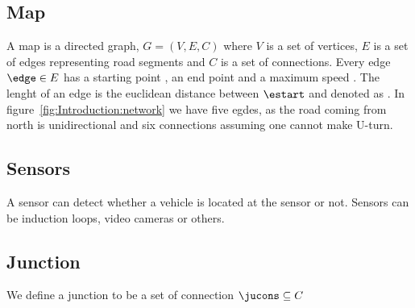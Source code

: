 \subsection{Map}
A map is a directed graph, $G = (V, E, C)$ where $V$ is a set of vertices, $E$ is a set of edges representing road segments and $C$ is a set of connections.
Every edge $\edge\in E$ has a starting point \estart, an end point \eend and a maximum speed \espeed. 
The lenght of an edge is the euclidean distance between $\estart$ and \eend denoted as \elength.
In figure~\ref{fig:Introduction:network} we have five egdes, as the road coming from north is unidirectional and six connections assuming one cannot make U-turn.

\subsection{Sensors}
A sensor can detect whether a vehicle is located at the sensor or not. Sensors can be induction loops, video cameras or others.


\subsection{Junction}
We define a junction \ju to be a set of connection $\jucons \subseteq C$

